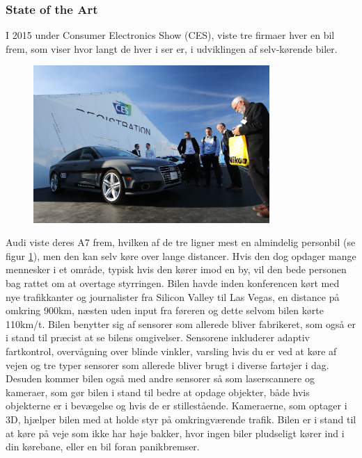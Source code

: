 \subsubsection{State of the Art} 
I 2015 under Consumer Electronics Show (CES), viste tre firmaer hver en bil frem, som viser hvor langt de hver i ser er, i udviklingen af selv-kørende biler.\cite{CES}
\begin{figure}[h!]
	\centering
	\includegraphics[width=0.8\textwidth]{images/150106_0345_ces.jpg}
	\label{fig:Audi_A7}
\end{figure}
Audi viste deres A7 frem, hvilken af de tre ligner mest en almindelig personbil (se figur \ref{fig:Audi_A7}), men den kan selv køre over lange distancer. Hvis den dog opdager mange mennesker i et område, typisk hvis den kører imod en by, vil den bede personen bag rattet om at overtage styrringen. Bilen havde inden konferencen kørt med nye trafikkanter og journalister fra Silicon Valley til Las Vegas, en distance på omkring 900km, næsten uden input fra føreren og dette selvom bilen kørte 110km/t. Bilen benytter sig af sensorer som allerede bliver fabrikeret, som også er i stand til præcist at se bilens omgivelser. Sensorene inkluderer adaptiv fartkontrol, overvågning over blinde vinkler, varsling hvis du er ved at køre af vejen og tre typer sensorer som allerede bliver brugt i diverse fartøjer i dag. Desuden kommer bilen også med andre sensorer så som laserscannere og kameraer, som gør bilen i stand til bedre at opdage objekter, både hvis objekterne er i bevægelse og hvis de er stillestående. Kameraerne, som optager i 3D, hjælper bilen med at holde styr på omkringværende trafik. Bilen er i stand til at køre på veje som ikke har høje bakker, hvor ingen biler pludseligt kører ind i din kørebane, eller en bil foran panikbremser.

